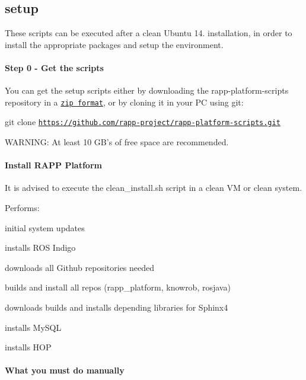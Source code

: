 \subsection*{setup}

These scripts can be executed after a clean Ubuntu 14. installation, in order to install the appropriate packages and setup the environment.

\paragraph*{Step 0 -\/ Get the scripts}

You can get the setup scripts either by downloading the rapp-\/platform-\/scripts repository in a \href{https://github.com/rapp-project/rapp-platform-scripts/zipball/master}{\tt zip format}, or by cloning it in your P\-C using git\-:

{\ttfamily git clone \href{https://github.com/rapp-project/rapp-platform-scripts.git}{\tt https\-://github.\-com/rapp-\/project/rapp-\/platform-\/scripts.\-git}}

W\-A\-R\-N\-I\-N\-G\-: At least 10 G\-B's of free space are recommended.

\paragraph*{Install R\-A\-P\-P Platform}

It is advised to execute the clean\-\_\-install.\-sh script in a clean V\-M or clean system.

Performs\-:
\begin{DoxyItemize}
\item initial system updates
\item installs R\-O\-S Indigo
\item downloads all Github repositories needed
\item builds and install all repos (rapp\-\_\-platform, knowrob, rosjava)
\item downloads builds and installs depending libraries for Sphinx4
\item installs My\-S\-Q\-L
\item installs H\-O\-P
\end{DoxyItemize}

\paragraph*{What you must do manually}

